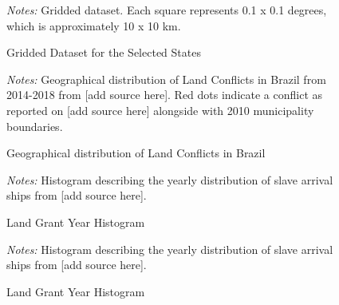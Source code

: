 \documentclass{article}
\begin{document}
\clearpage

\begin{figure}[h!]
  \caption{Gridded Dataset for the Selected States}
  \begin{center}
  \end{center}
  \textit{Notes:} Gridded dataset. Each square represents 0.1 x 0.1 degrees, which is approximately 10 x 10 km.  
  \label{fig:gridded_dataset}
\end{figure}

\clearpage

\begin{figure}[h!]
  \caption{Geographical distribution of Land Conflicts in Brazil}
  \begin{center}
  \end{center}
  \textit{Notes:} Geographical distribution of Land Conflicts in Brazil from 2014-2018 from [add source here]. Red dots indicate a conflict as reported on [add source here] alongside with 2010 municipality boundaries.
  \label{fig:cpt_conflict}
\end{figure}

\clearpage

\begin{figure}[h!]
  \caption{Land Grant Year Histogram}
  \begin{center}
  \end{center}
  \textit{Notes:} Histogram describing the yearly distribution of slave arrival ships from [add source here].  
  \label{fig:slave_distribution}
\end{figure}

\clearpage

\begin{figure}[h!]
  \caption{Land Grant Year Histogram}
  \begin{center}
  \end{center}
  \textit{Notes:} Histogram describing the yearly distribution of slave arrival ships from [add source here].  
  \label{fig:slave_distribution_region}
\end{figure}
\end{document}
